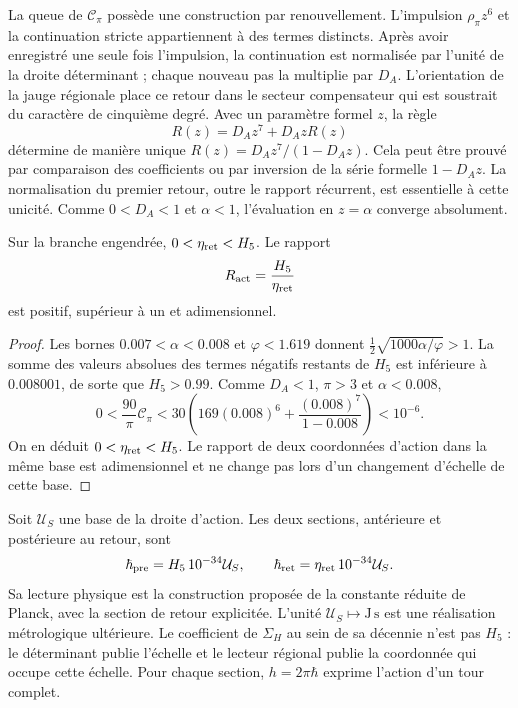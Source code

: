 La queue de \(\mathcal C_\pi\) possède une construction par renouvellement.
L’impulsion \(\rho_\pi z^6\) et la continuation stricte appartiennent
à des termes distincts. Après avoir enregistré une seule fois l’impulsion,
la continuation est normalisée par l’unité de la droite déterminant ;
chaque nouveau pas la multiplie par \(D_A\). L’orientation de la
jauge régionale place ce retour dans le secteur compensateur qui
est soustrait du caractère de cinquième degré.
Avec un paramètre formel \(z\), la règle
\begin{equation}
 R(z)=D_Az^7+D_AzR(z)
 \label{vi:vi:dep:renovacion}
\end{equation}
détermine de manière unique
\(R(z)=D_Az^7/(1-D_Az)\). Cela peut être prouvé par comparaison des
coefficients ou par inversion de la série formelle \(1-D_Az\).
La normalisation du premier retour, outre le rapport récurrent,
est essentielle à cette unicité. Comme \(0<D_A<1\) et \(\alpha<1\),
l’évaluation en \(z=\alpha\) converge absolument.

\begin{proposition}
\label{vi:vi:dep:positividad-accion}
Sur la branche engendrée, \(0<\eta_{\rm ret}<H_5\). Le rapport
\begin{equation}
 R_{\rm act}=\frac{H_5}{\eta_{\rm ret}}
 \label{vi:vi:dep:Ract}
\end{equation}
est positif, supérieur à un et adimensionnel.
\end{proposition}
\begin{proof}
Les bornes \(0.007<\alpha<0.008\) et \(\varphi<1.619\) donnent
\(\tfrac12\sqrt{1000\alpha/\varphi}>1\). La somme des valeurs absolues
des termes négatifs restants de \(H_5\) est inférieure à
\(0.008001\), de sorte que \(H_5>0.99\).
Comme \(D_A<1\), \(\pi>3\) et \(\alpha<0.008\),
\[
 0<\frac{90}{\pi}\mathcal C_\pi
 <30\left(169(0.008)^6+
                  \frac{(0.008)^7}{1-0.008}\right)<10^{-6}.
\]
On en déduit \(0<\eta_{\rm ret}<H_5\). Le rapport de deux coordonnées
d’action dans la même base est adimensionnel et ne change pas lors d’un changement d’échelle
de cette base.
\end{proof}

Soit \(\mathcal U_S\) une base de la droite d’action. Les deux
sections, antérieure et postérieure au retour, sont
\begin{equation}
 \hbar_{\rm pre}=H_5\,10^{-34}\mathcal U_S,
 \qquad
 \hbar_{\rm ret}=\eta_{\rm ret}\,10^{-34}\mathcal U_S.
 \label{vi:vi:dep:hbar}
\end{equation}
Sa lecture physique est la construction proposée de la constante réduite
de Planck, avec la section de retour explicitée. L'unité
\(\mathcal U_S\mapsto\mathrm{J\,s}\) est une réalisation métrologique
ultérieure. Le coefficient de \(\Sigma_H\) au sein de sa décennie n'est pas
\(H_5\) : le déterminant publie l'échelle et le lecteur régional
publie la coordonnée qui occupe cette échelle. Pour chaque section,
\(h=2\pi\hbar\) exprime l'action d'un tour complet.

